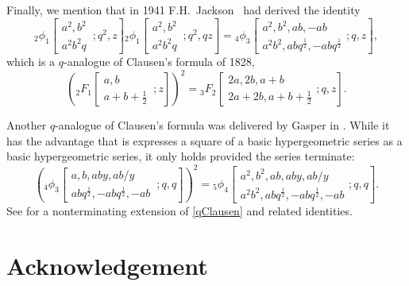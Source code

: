 Finally, we mention that in 1941 F.H.~Jackson~\cite{J}
had derived the identity
\begin{equation}
{}_2\phi_1\!\left[\begin{matrix}a^2,b^2\\
a^2b^2q\end{matrix}\,;q^2,z\right]
{}_2\phi_1\!\left[\begin{matrix}a^2,b^2\\
a^2b^2q\end{matrix}\,;q^2,qz\right]
={}_4\phi_3\!\left[\begin{matrix}a^2,b^2,ab,-ab\\
a^2b^2,abq^{\frac 12},-abq^{\frac 12}\end{matrix};q,z\right],
\end{equation}
which is a $q$-analogue of Clausen's formula of 1828,
\begin{equation}
\left({}_2F_1\!\left[\begin{matrix}a,b\\
a+b+\frac 12\end{matrix}\,;z\right]\right)^2
={}_3F_2\!\left[\begin{matrix}2a,2b,a+b\\
2a+2b,a+b+\frac 12\end{matrix};q,z\right].
\end{equation}

Another $q$-analogue of Clausen's formula
was delivered by Gasper in \cite{G}.
While it has the advantage that is expresses a square of a
basic hypergeometric series as a  basic hypergeometric
series, it only holds provided the series terminate:
\begin{equation}\label{qClausen}
\left({}_4\phi_3\!\left[\begin{matrix}a,b,aby,ab/y\\
abq^{\frac 12},-abq^{\frac 12},-ab\end{matrix}\,;q,q\right]\right)^2
={}_5\phi_4\!\left[\begin{matrix}a^2,b^2,ab,aby,ab/y\\
a^2b^2,abq^{\frac 12},-abq^{\frac 12},-ab\end{matrix};q,q\right].
\end{equation}
See \cite[Sec.~8.8]{GR} for a nonterminating extension
of \eqref{qClausen} and related identities.

\section*{Acknowledgement}

